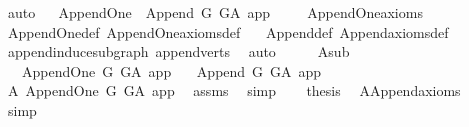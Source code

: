 \begin{isabellebody}
\ auto\isanewline
{}\isamarkupfalse%
%
\endisatagproof
{\isafoldproof}%
%
\isadelimproof
\ \isanewline
%
\endisadelimproof
\isanewline
\isanewline
{}\isamarkupfalse%
\ Append{\isacharunderscore}{\kern0pt}One\ {\isasymsubseteq}\ Append\ G\ G{\isacharunderscore}{\kern0pt}A\ {\isachardoublequoteopen}{\isacharbraceleft}{\kern0pt}app{\isacharbraceright}{\kern0pt}{\isachardoublequoteclose}\ \isanewline
%
\isadelimproof
\ \ %
\endisadelimproof
%
\isatagproof
{}\isamarkupfalse%
\ Append{\isacharunderscore}{\kern0pt}One{\isacharunderscore}{\kern0pt}axioms\ \ \isanewline
\ \ \isamarkupfalse%
\ Append{\isacharunderscore}{\kern0pt}One{\isacharunderscore}{\kern0pt}def\ Append{\isacharunderscore}{\kern0pt}One{\isacharunderscore}{\kern0pt}axioms{\isacharunderscore}{\kern0pt}def\ \isanewline
\ \ Append{\isacharunderscore}{\kern0pt}def\ Append{\isacharunderscore}{\kern0pt}axioms{\isacharunderscore}{\kern0pt}def\isanewline
\ \ \isamarkupfalse%
\ append{\isacharunderscore}{\kern0pt}induce{\isacharunderscore}{\kern0pt}subgraph\ append{\isacharunderscore}{\kern0pt}verts\ \isamarkupfalse%
\ auto%
\endisatagproof
{\isafoldproof}%
%
\isadelimproof
\ \isanewline
%
\endisadelimproof
\ \ \isanewline
{}\isamarkupfalse%
\ A{}{\isacharunderscore}{\kern0pt}sub{\isacharcolon}{\kern0pt}\isanewline
\ \ \ {\isachardoublequoteopen}Append{\isacharunderscore}{\kern0pt}One\ G\ G{\isacharunderscore}{\kern0pt}A\ app{\isachardoublequoteclose}\isanewline
\ \ \ {\isachardoublequoteopen}Append\ G\ G{\isacharunderscore}{\kern0pt}A\ {\isacharbraceleft}{\kern0pt}app{\isacharbraceright}{\kern0pt}{\isachardoublequoteclose}\isanewline
%
\isadelimproof
%
\endisadelimproof
%
\isatagproof
{}\isamarkupfalse%
\ {\isacharminus}{\kern0pt}\isanewline
\ \ \isamarkupfalse%
\ A{}{\isacharcolon}{\kern0pt}\ Append{\isacharunderscore}{\kern0pt}One\ G\ G{\isacharunderscore}{\kern0pt}A\ app\ \isamarkupfalse%
\ assms\ \isamarkupfalse%
\ simp\isanewline
\ \ \isamarkupfalse%
\ {\isacharquery}{\kern0pt}thesis\ \isamarkupfalse%
\ A{}{\isachardot}{\kern0pt}Append{\isacharunderscore}{\kern0pt}axioms\ \isamarkupfalse%
\ simp\isanewline
{}\isamarkupfalse%
%
\endisatagproof
{\isafoldproof}%
%
\isadelimproof
%
\endisadelimproof
%
\isadelimdocument
%
\endisadelimdocument
%
\isatagdocument
%
\end{isabellebody}
